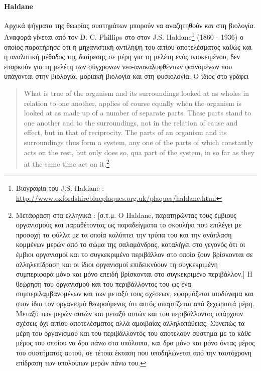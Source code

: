\documentclass[a4paper,12pt,twoside]{report}
\begin{document}
{			\paragraph{Haldane}{Αρχικά ψήγματα της θεωρίας συστημάτων μπορούν να αναζητηθούν \textit{και} στη βιολογία. Αναφορά γίνεται από τον D. C. Phillips στο \cite[σελ. 8]{SystemsTheoryADiscreditedPhilosophy:Phillips1969} στον J.S. Haldane\footnote{Βιογραφία του J.S. Haldane : \url{http://www.oxfordshireblueplaques.org.uk/plaques/haldane.html}} (1860 - 1936) ο οποίος παρατήρησε ότι η μηχανιστική αντίληψη του αιτίου-αποτελέσματος καθώς και η αναλυτική μέθοδος της διαίρεσης σε μέρη για τη μελέτη ενός υποκειμένου, δεν επαρκούν για τη μελέτη των σύγχρονων νεο-ανακαλυφθέντων  φαινομένων που υπάγονται στην βιολογία, μοριακή βιολογία και στη φυσιολογία. Ο ίδιος στο \cite[σελ. 33]{LifeAndMechanism:Haldane1884} γράφει \begin{quote}What is true of the organism and its surroundings looked at as wholes in relation to one another, applies of course equally when the organism is looked at as made up of a number of separate parts. These parts stand to one another and to the surroundings, not in the relation of cause and effect, but in that of reciprocity. The parts of an organism and its surroundings thus form a system, any one of the parts of which constantly acts on the rest, but only does so, qua part of the system, in so far as they at the same time act on it.\footnote{Μετάφραση στα ελληνικά : [σ.τ.μ. Ο Haldane, παρατηρώντας τους έμβιους οργανισμούς και παραθέτοντας ως παραδείγματα το σκουλήκι που επιλέγει με προσοχή τα φύλλα με τα οποία καλύπτει την τρύπα του και την ανάπλαση κομμένων μερών από το σώμα της σαλαμάνδρας, καταλήγει στο γεγονός ότι οι έμβιοι οργανισμοί και το συγκεκριμένο περιβάλλον στο οποίο ζουν βρίσκονται σε αλληλεπίδραση και οι ίδιοι οργανισμοί επιδεικνύουν τη συγκεκριμένη συμπεριφορά μόνο και μόνο επειδή βρίσκονται στο συγκεκριμένο περιβάλλον.] Η θεώρηση του οργανισμού και του περιβάλλοντος του ως ένα συμπεριλαμβανομένων και των μεταξύ τους σχέσεων, εφαρμόζεται ισοδύναμα και στον ίδιο τον οργανισμό θεωρούμενος ότι αυτός απαρτίζεται από ξεχωριστά μέρη. Μεταξύ των μερών αυτών και μεταξύ αυτών και του περιβάλλοντος υπάρχουν σχέσεις όχι αιτίου-αποτελέσματος αλλά αμοιβαίας αλληλοπάθειας. Συνεπώς τα μέρη του οργανισμού και του περιβάλλοντός του αποτελούν σύστημα με το κάθε μέρος του οποίου να δρα πάνω στα υπόλοιπα, και δρα μόνο και μόνο όντας μέρος του συστήματος αυτού, σε τέτοια έκταση που υποδηλώνεται από την ταυτόχρονη επίδραση των υπολοίπων μερών πάνω του.}\end{quote}
			}
}
\end{document}
